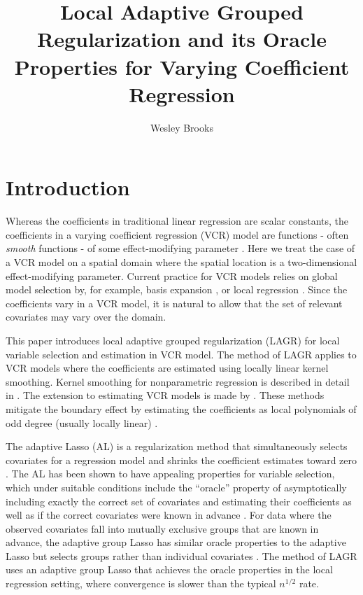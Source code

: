 \documentclass[authoryear,review, 12pt]{elsarticle}
\begin{document}
\begin{frontmatter}

\title{Local Adaptive Grouped Regularization and its Oracle Properties for Varying Coefficient Regression}


\author[wrbrooks]{Wesley Brooks}

\address[wrbrooks]{Department of Statistics, University of Wisconsin, Madison, WI 53706}

\end{frontmatter}
\vspace{-4em}

\section{Introduction}

Whereas the coefficients in traditional linear regression are scalar
constants, the coefficients in a varying coefficient regression (VCR)
model are functions - often \emph{smooth} functions - of some effect-modifying
parameter \citep{Hastie-Tibshirani-1993}. Here
we treat the case of a VCR model on a spatial domain where the spatial
location is a two-dimensional effect-modifying parameter. Current
practice for VCR models relies on global model selection by, for example, basis expansion \citep{Wang-2008a}, or
local regression \citep{Wang-Xia-2009}. Since the coefficients vary
in a VCR model, it is natural to allow that the set of relevant covariates may vary over the domain.

This paper introduces local adaptive grouped regularization (LAGR)
for local variable selection and estimation in VCR model. The method of LAGR applies to VCR models
where the coefficients are estimated using locally linear kernel smoothing.
Kernel smoothing for nonparametric regression is described in detail
in \citet*{Fan-Gijbels-1996}. The extension to estimating VCR models
is made by \citet{Fan-Zhang-1999}. These methods mitigate the boundary effect by
estimating the coefficients as local polynomials of odd degree (usually
locally linear) \citep{Hastie:1993b}.

The adaptive Lasso (AL) is a regularization method that
simultaneously selects covariates for a regression model and shrinks
the coefficient estimates toward zero \citep{Zou-2006}. The AL has been shown to have appealing properties for
variable selection, which under suitable conditions include the ``oracle''
property of asymptotically including exactly the correct set of covariates
and estimating their coefficients as well as if the correct covariates
were known in advance \citep{Zou-2006}. For data where the observed
covariates fall into mutually exclusive groups that are known in advance,
the adaptive group Lasso has similar oracle properties to the adaptive
Lasso but selects groups rather than individual covariates
\citep{Yuan-Lin-2006,Wang-Leng-2008}. The method of LAGR uses an adaptive group Lasso that achieves the oracle properties in the local regression setting, where convergence is slower than the typical $n^{1/2}$ rate.
\end{document}
